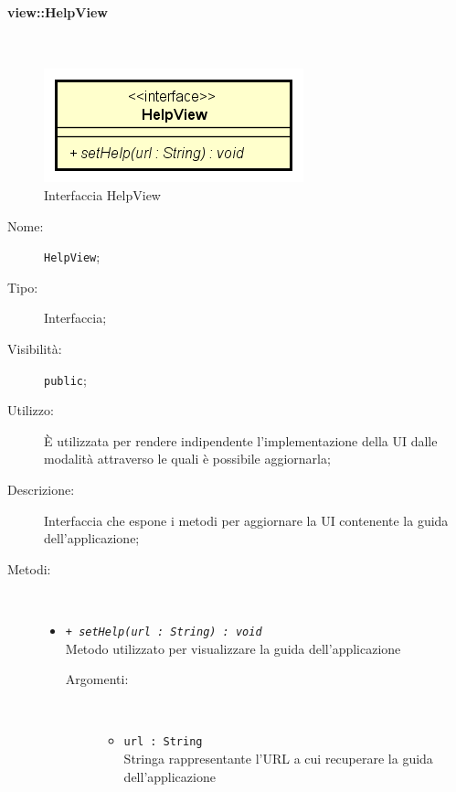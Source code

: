 \documentclass[../DefinizioneDiProdotto.tex]{subfiles}
\begin{document}
\paragraph{view::HelpView}
\
\begin{figure}[H]
	\centering
	\includegraphics[width=\maxwidth]{img/HelpView.png}
	\caption{Interfaccia HelpView}\label{fig:view::HelpView} 
\end{figure}
\begin{description}
	\item[Nome:] \texttt{HelpView};
	\item[Tipo:] Interfaccia;
	\item[Visibilità:] \texttt{public};
	\item[Utilizzo:] È utilizzata per rendere indipendente l'implementazione della UI dalle modalità attraverso le quali è possibile aggiornarla;
	\item[Descrizione:] Interfaccia che espone i metodi per aggiornare la UI contenente la guida dell'applicazione;
	\item[Metodi:] \
	\begin{itemize}
		\item \texttt{+ \textit{setHelp(url : String) : void}}\\
		Metodo utilizzato per visualizzare la guida dell'applicazione
		\begin{description}
			\item[Argomenti:] \
			\begin{itemize}
				\item \texttt{url : String}\\
				Stringa rappresentante l'URL a cui recuperare la guida dell'applicazione\end{itemize}
		\end{description}
	\end{itemize}
\end{description}
\end{document}
